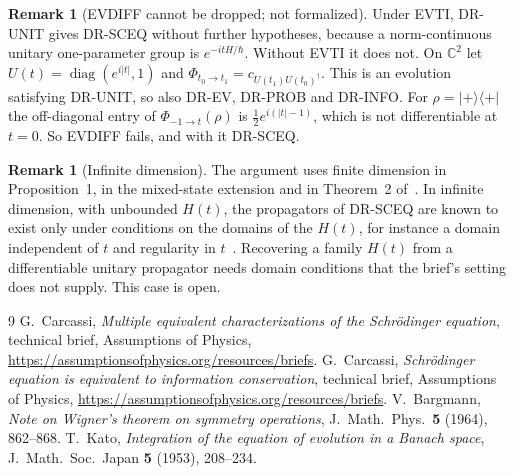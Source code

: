 \documentclass[11pt]{article}
\theoremstyle{definition}
\newtheorem{remark}[theorem]{Remark}
\begin{document}
\begin{remark}[EVDIFF cannot be dropped; not formalized]
  Under EVTI, DR-UNIT gives DR-SCEQ without further hypotheses, because a norm-continuous unitary
  one-parameter group is $e^{-itH/\hbar}$. Without EVTI it does not. On $\mathbb C^2$ let
  $U(t) = \operatorname{diag}(e^{i|t|}, 1)$ and $\Phi_{t_0\to t_1} = c_{U(t_1)U(t_0)^\dagger}$.
  This is an evolution satisfying DR-UNIT, so also DR-EV, DR-PROB and DR-INFO. For
  $\rho = |{+}\rangle\langle{+}|$ the off-diagonal entry of $\Phi_{-1\to t}(\rho)$ is
  $\tfrac12 e^{i(|t|-1)}$, which is not differentiable at $t = 0$. So EVDIFF fails, and with it
  DR-SCEQ.
\end{remark}

\begin{remark}[Infinite dimension]
  The argument uses finite dimension in Proposition~1, in the mixed-state extension and in
  Theorem~2 of~\cite{info}. In infinite dimension, with unbounded $H(t)$, the propagators of
  DR-SCEQ are known to exist only under conditions on the domains of the $H(t)$, for instance a
  domain independent of $t$ and regularity in $t$~\cite{kato}. Recovering a family $H(t)$ from a
  differentiable unitary propagator needs domain conditions that the brief's setting does not
  supply. This case is open.
\end{remark}

\begin{thebibliography}{9}
 G.~Carcassi, \emph{Multiple equivalent characterizations of the Schr\"odinger
  equation}, technical brief, Assumptions of Physics,
  \url{https://assumptionsofphysics.org/resources/briefs}.
 G.~Carcassi, \emph{Schr\"odinger equation is equivalent to information
  conservation}, technical brief, Assumptions of Physics,
  \url{https://assumptionsofphysics.org/resources/briefs}.
 V.~Bargmann, \emph{Note on Wigner's theorem on symmetry operations},
  J.~Math.\ Phys.\ \textbf{5} (1964), 862--868.
 T.~Kato, \emph{Integration of the equation of evolution in a Banach space},
  J.~Math.\ Soc.\ Japan \textbf{5} (1953), 208--234.
\end{thebibliography}
\end{document}
